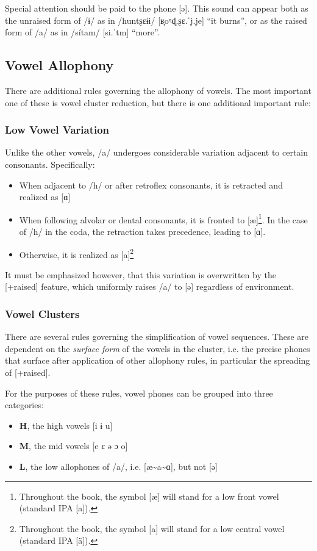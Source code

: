 \documentclass[paper=6in:9in, fontsize=10.5]{scrbook}
\newcommand{\en}[1]{``#1''}
\newcommand{\y}{ɨ}
\newcommand{\ý}{ɨ́}
\newcommand{\glem}[1]{\underline{\smash{#1}}}
\begin{document}
Special attention should be paid to the phone [ə]. This sound can appear both as the unraised form of /\y/ as in /huntʂɛ\y{}i/ [ʁ̞oᶯɖ.ʂɛ.ˈj\glem{ə}.je] \en{it burns}, or as the raised form of /a/ as in \mbox{/sítam/} [si.ˈt\glem{ə}m] \en{more}.


\subsection{Vowel Allophony}  
There are additional rules governing the allophony of vowels. The most important one of these is vowel cluster reduction, but there is one additional important rule:

\subsubsection{Low Vowel Variation} Unlike the other vowels, /a/ undergoes considerable variation adjacent to certain consonants. Specifically: 
\begin{itemize}
\item When adjacent to /h/ or after retroflex consonants, it is retracted and realized as [ɑ]
\item When following alvolar or dental consonants, it is fronted to [æ]\footnote{Throughout the book, the symbol [æ] will stand for a low front vowel (standard IPA [a]).}. In the case of /h/ in the coda, the retraction takes precedence, leading to [ɑ].
\item Otherwise, it is realized as [a]\footnote{Throughout the book, the symbol [a] will stand for a low central vowel (standard IPA [ä]).}
\end{itemize}

It must be emphasized however, that this variation is overwritten by the [+raised] feature, which uniformly raises /a/ to [ə] regardless of environment.

\subsubsection{Vowel Clusters}\label{sssec:vowel_cluster}
There are several rules governing the simplification of vowel sequences. These are dependent on the \emph{surface form} of the vowels in the cluster, i.e. the precise phones that surface after application of other allophony rules, in particular the spreading of [+raised]. 

For the purposes of these rules, vowel phones can be grouped into three categories: 
\begin{itemize}
\item \textbf{H}, the high vowels [i \y{} u]
\item \textbf{M}, the mid vowels [e ɛ ə ɔ o]
\item \textbf{L}, the low allophones of /a/, i.e. [æ\textasciitilde{}a\textasciitilde{}ɑ], but not [ə]
\end{itemize}
\end{document}
